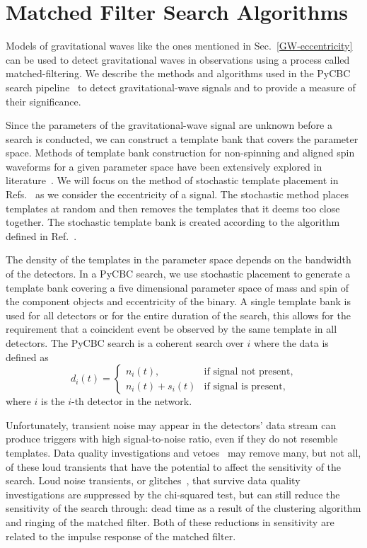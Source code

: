 \section{Matched Filter Search Algorithms}\label{matched-filtering}

Models of gravitational waves like the ones mentioned in Sec.~\ref{GW-eccentricity} can be used to detect gravitational waves in observations using a process called matched-filtering. We describe the methods and algorithms used in the PyCBC search pipeline~\cite{Allen:2005fk,Allen:2004gu,Nitz:2017svb,Canton:2014ena,Usman:2015kfa} to detect gravitational-wave signals and to provide a measure of their significance. 

Since the parameters of the gravitational-wave signal are unknown before a search is conducted, we can construct a template bank that covers the parameter space. Methods of template bank construction for non-spinning and aligned spin waveforms for a given parameter space have been extensively explored in literature~\cite{Owen:1995tm,Owen:1998dk,Cokelaer:2007kx,Brown:2012qf,Harry:2009ea,Manca:2009xw,Harry:2013tca}. We will focus on the method of stochastic template placement in Refs.~\cite{Harry:2009ea, Manca:2009xw} as we consider the eccentricity of a signal. The stochastic method places templates at random and then removes the templates that it deems too close together. The stochastic template bank is created according to the algorithm defined in Ref.~\cite{Harry:2009ea}.
 
The density of the templates in the parameter space depends on the bandwidth of the detectors. In a PyCBC search, we use stochastic placement to generate a template bank covering a five dimensional parameter space of mass and spin of the component objects and eccentricity of the binary.  A single template bank is used for all detectors or for the entire duration of the search, this allows for the requirement that a coincident event be observed by the same template in all detectors. The PyCBC search is a coherent search over $i$ where the data is defined as
\begin{equation}
d_i(t) = \begin{cases}
        n_i(t), & \text{if signal not present},\\
        n_i(t) + s_i(t) & \text{if signal is present},
    \end{cases}
\end{equation}
where $i$ is the $i$-th detector in the network.

Unfortunately, transient noise may appear in the detectors' data stream can produce triggers with high signal-to-noise ratio, even if they do not resemble templates. Data quality investigations and vetoes~\cite{Aasi:2012wd, Aasi:2014mqd} may remove many, but not all, of these loud transients that have the potential to affect the sensitivity of the search.  Loud noise transients, or glitches~\cite{Nuttall:2015dqa}, that survive data quality investigations are suppressed by the chi-squared test, but can still reduce the sensitivity of the search through: dead time as a result of the clustering algorithm and ringing of the matched filter. Both of these reductions in sensitivity are related to the impulse response of the matched filter.

